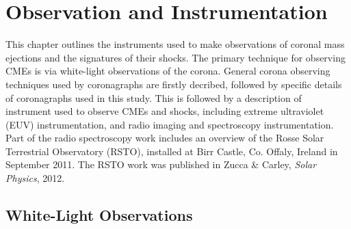 
\singlespacing
\chapter{Observation and Instrumentation} 
\label{chap:3}
\doublespacing
This chapter outlines the instruments used to make observations of coronal mass ejections and the signatures of their shocks. The primary technique for observing CMEs is via white-light observations of the corona. General corona observing techniques used by coronagraphs are firstly decribed, followed by specific details of coronagraphs used in this study. This is followed by a description of instrument used to observe CMEs and shocks, including extreme ultraviolet (EUV) instrumentation, and radio imaging and spectroscopy instrumentation. Part of the radio spectroscopy work includes an overview of the Rosse Solar Terrestrial Observatory (RSTO), installed at Birr Castle, Co. Offaly, Ireland in September 2011. The RSTO work was published in Zucca \& Carley, {\it Solar Physics}, 2012.
\clearpage
\singlespacing
\section{White-Light Observations}\label{sec:1}

